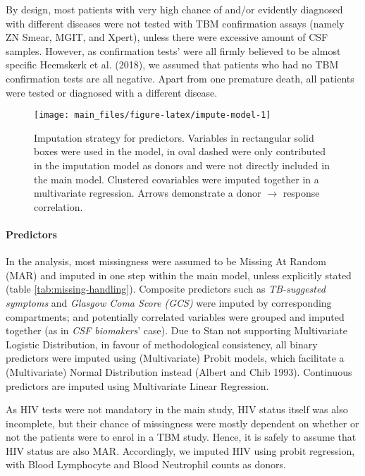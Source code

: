 \documentclass[
]{article}
\begin{document}
By design, most patients with very high chance of and/or evidently diagnosed with different diseases were not tested with TBM confirmation assays (namely ZN Smear, MGIT, and Xpert), unless there were excessive amount of CSF samples. However, as confirmation tests' were all firmly believed to be almost specific Heemskerk et al. (2018), we assumed that patients who had no TBM confirmation tests are all negative. Apart from one premature death, all patients were tested or diagnosed with a different disease.

\newpage

\begin{figure}

{\centering \texttt{[image: main\_files/figure-latex/impute-model-1]} 

}

\caption{Imputation strategy for predictors. Variables in rectangular solid boxes were used in the model, in oval dashed were only contributed in the imputation model as donors and were not directly included in the main model. Clustered covariables were imputed together in a multivariate regression. Arrows demonstrate a donor $\rightarrow$ response correlation.}\label{fig:impute-model}
\end{figure}

\hypertarget{predictors}{%
\paragraph{Predictors}\label{predictors}}

In the analysis, most missingness were assumed to be Missing At Random (MAR) and imputed in one step within the main model, unless explicitly stated (table \ref{tab:missing-handling}). Composite predictors such as \emph{TB-suggested symptoms} and \emph{Glasgow Coma Score (GCS)} were imputed by corresponding compartments; and potentially correlated variables were grouped and imputed together (as in \emph{CSF biomakers}' case). Due to Stan not supporting Multivariate Logistic Distribution, in favour of methodological consistency, all binary predictors were imputed using (Multivariate) Probit models, which facilitate a (Multivariate) Normal Distribution instead (Albert and Chib 1993). Continuous predictors are imputed using Multivariate Linear Regression.

As HIV tests were not mandatory in the main study, HIV status itself was also incomplete, but their chance of missingness were mostly dependent on whether or not the patients were to enrol in a TBM study. Hence, it is safely to assume that HIV status are also MAR. Accordingly, we imputed HIV using probit regression, with Blood Lymphocyte and Blood Neutrophil counts as donors.
\end{document}
